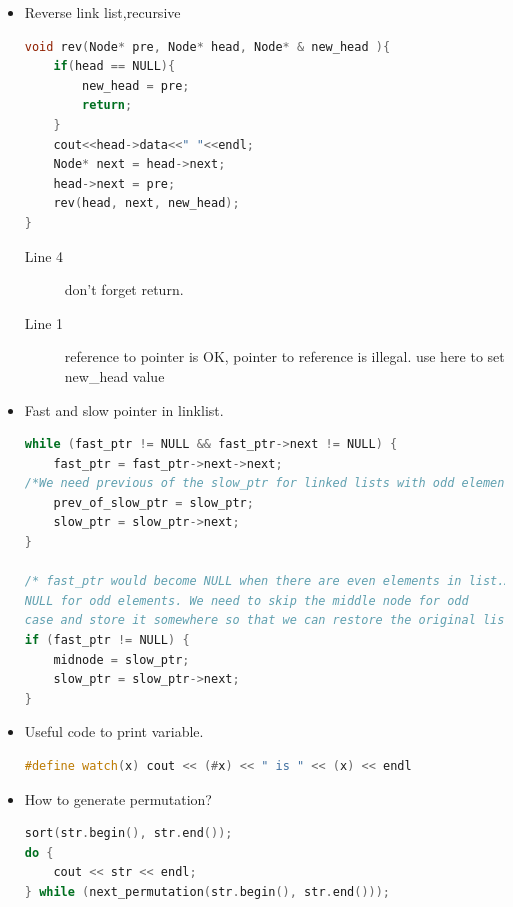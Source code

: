 \documentclass[a4paper,11pt,twoside]{book}
\begin{document}
\begin{itemize}

\item Reverse link list,recursive
\begin{lstlisting}[frame=single, language=c++]	
void rev(Node* pre, Node* head, Node* & new_head ){
	if(head == NULL){
		new_head = pre;
		return;
	}
	cout<<head->data<<" "<<endl;
	Node* next = head->next;
	head->next = pre;
	rev(head, next, new_head);
}	
\end{lstlisting}
\begin{description}
	\item[Line 4] don't forget return.
	\item[Line 1] reference to pointer is OK, pointer to reference is illegal. use here to set new\_head value
\end{description}


\item Fast and slow pointer in linklist.	
\begin{lstlisting}[frame=single, language=c++]	
while (fast_ptr != NULL && fast_ptr->next != NULL) {
	fast_ptr = fast_ptr->next->next;	
/*We need previous of the slow_ptr for linked lists with odd elements */
	prev_of_slow_ptr = slow_ptr;
	slow_ptr = slow_ptr->next;
}

/* fast_ptr would become NULL when there are even elements in list.And not 
NULL for odd elements. We need to skip the middle node for odd 
case and store it somewhere so that we can restore the original list*/
if (fast_ptr != NULL) {
	midnode = slow_ptr;
	slow_ptr = slow_ptr->next;
}
\end{lstlisting}	


	\item Useful code to print variable. 
\begin{lstlisting}[frame=single, language=c++]
	#define watch(x) cout << (#x) << " is " << (x) << endl
\end{lstlisting}
	
	\item How to generate permutation?
\begin{lstlisting}[frame=single, language=c++]
sort(str.begin(), str.end());
do {
	cout << str << endl;
} while (next_permutation(str.begin(), str.end()));	
\end{lstlisting}	


\end{itemize}
\end{document}
